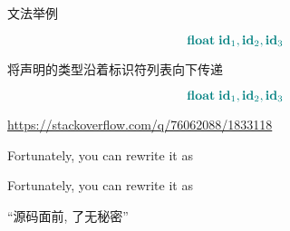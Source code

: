 
\begin{frame}{}
  \begin{center}
    文法举例

    \[
      \textcolor{teal}{\text{\bf float}\; \text{\bf id}_{1}, \text{\bf id}_{2}, \text{\bf id}_{3}}
    \]
  \end{center}
\end{frame}

\begin{frame}{}
  \begin{center}
     将声明的类型沿着标识符列表向下传递

    \[
        \textcolor{teal}{\text{\bf float}\; \text{\bf id}_{1}, \text{\bf id}_{2}, \text{\bf id}_{3}}
    \]
  \end{center}
\end{frame}

\begin{frame}{}
  \begin{center}
    \url{https://stackoverflow.com/q/76062088/1833118}
  \end{center}

  \pause
  \begin{center}
    Fortunately, you can rewrite it as 
  \end{center}
\end{frame}

\begin{frame}{}
  \begin{center}
    Fortunately, you can rewrite it as 

    \vspace{0.80cm}
  \end{center}
\end{frame}

\begin{frame}{}
  \begin{center}
    ``源码面前, 了无秘密''


  \end{center}
\end{frame}

